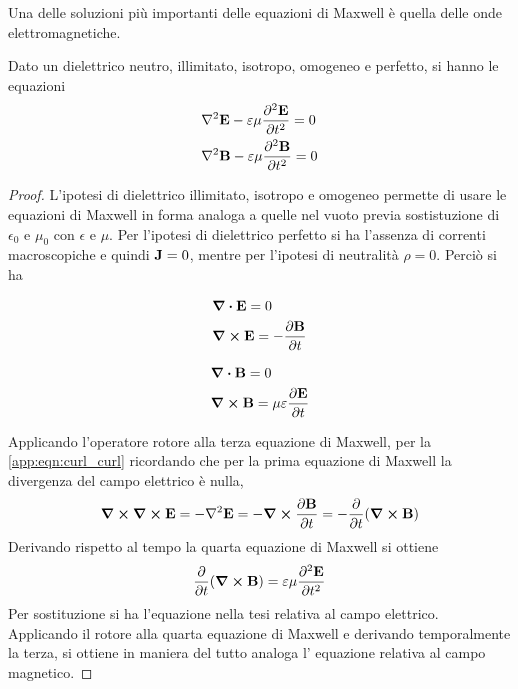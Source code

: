 Una delle soluzioni più importanti delle equazioni di Maxwell è quella delle onde elettromagnetiche.
\begin{obs}
    Dato un dielettrico neutro, illimitato, isotropo, omogeneo e perfetto, si hanno le equazioni
    \begin{equation}
        \label{eqn:diff_onde}
        \begin{split}
            &\laplacian{\vb{E}}-\epsilon\mu \pdv[2]{\vb{E}}{t}=0\\
            &\laplacian{\vb{B}}-\epsilon\mu \pdv[2]{\vb{B}}{t}=0
        \end{split}
    \end{equation}
\end{obs}
\begin{proof}
    L'ipotesi di dielettrico illimitato, isotropo e omogeneo permette di usare le equazioni di Maxwell in forma analoga a quelle
    nel vuoto previa sostistuzione di $\epsilon_0$ e $\mu_0$ con $\epsilon$ e $\mu$.
    Per l'ipotesi di dielettrico perfetto si ha l'assenza di correnti macroscopiche e quindi $\vb{J}=0$, mentre per l'ipotesi di
    neutralità $\rho=0$. Perciò si ha
\begin{minipage}[t]{0.5\textwidth}
\[
    \begin{split}
        & \div{\vb{E}}=0                    \\
        & \curl{\vb{E}}=-\pdv{\vb{B}}{t}       \\
    \end{split}
\]
\end{minipage}
\begin{minipage}[t]{0.5\textwidth}
\[
    \begin{split}
        & \div{\vb{B}}=0                       \\
        & \curl{\vb{B}}=\mu\varepsilon\pdv{\vb{E}}{t} \\
    \end{split}
\]
\end{minipage}
    Applicando l'operatore rotore alla terza equazione di Maxwell, per la \eqref{app:eqn:curl_curl} ricordando che per la prima
    equazione di Maxwell la divergenza del campo elettrico è nulla,
    \[
        \curl{\curl{\vb{E}}}=-\laplacian{\vb{E}}=-\curl{\pdv{\vb{B}}{t}}=-\pdv{t}(\curl{\vb{B}})
    \]
    Derivando rispetto al tempo la quarta equazione di Maxwell si ottiene
    \[
        \pdv{t}(\curl{\vb{B}})=\varepsilon\mu\pdv[2]{\vb{E}}{t}
    \]
    Per sostituzione si ha l'equazione nella tesi relativa al campo elettrico. Applicando il rotore
    alla quarta equazione di Maxwell e derivando temporalmente la terza, si ottiene in maniera del tutto analoga l'
    equazione relativa al campo magnetico.
\end{proof}

